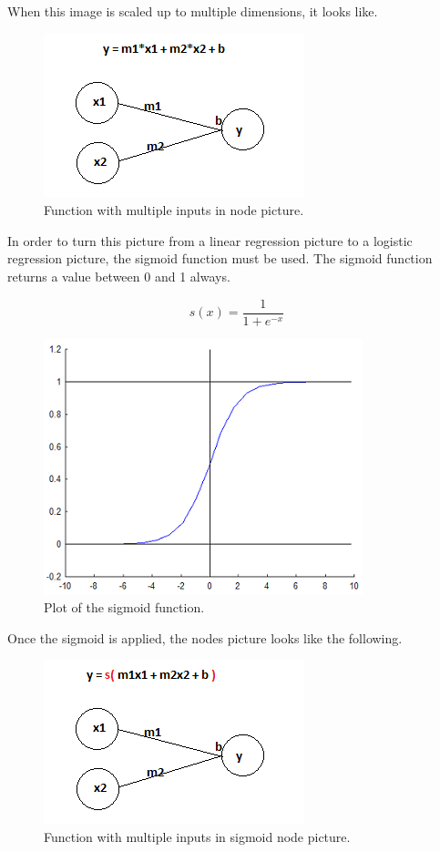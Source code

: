 \documentclass[12pt, oneside]{book}
\begin{document}
When this image is scaled up to multiple dimensions, it looks like.

\begin{figure}[H]
	\centering
	\includegraphics[]{mlineNodes.png}
	\caption{Function with multiple inputs in node picture.}
	\label{fig:mlineNode}
\end{figure}

In order to turn this picture from a linear regression picture to a logistic regression picture, the sigmoid function must be used. The sigmoid function returns a value between 0 and 1 always. \cite{lazyprogrammer.me_data_nodate-2}

\begin{equation}
s(x) = \frac{1}{1+e^{-x}}
\end{equation}

\begin{figure}[H]
	\centering
	\includegraphics[]{sigmoid.png}
	\caption{Plot of the sigmoid function.}
	\label{fig:sigmoid}
\end{figure}

Once the sigmoid is applied, the nodes picture looks like the following. \cite{lazyprogrammer.me_data_nodate-2}

\begin{figure}[H]
	\centering
	\includegraphics[]{sigNodes.png}
	\caption{Function with multiple inputs in sigmoid node picture.}
	\label{fig:sigNode}
\end{figure}
\end{document}
